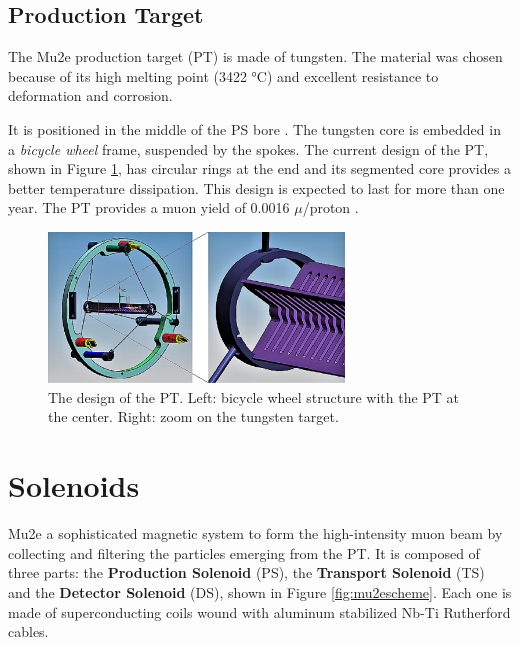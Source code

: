 \subsection{Production Target}
The Mu2e production target (PT) is made of tungsten. 
The material was chosen because of its high 
melting point (3422 °C) and excellent resistance to deformation and corrosion.

It is positioned in the middle of the PS bore \cite{bartoszek2015mu2e}.
The tungsten core is embedded in a \textit{bicycle wheel} frame, 
suspended by the spokes.
The current design of the PT, shown in Figure \ref{fig:PT}, 
has circular rings at the end and its segmented core provides a better temperature 
dissipation. This design is expected to last for more than one year. The PT provides a muon yield of 0.0016 $\mu$/proton \cite{PT}.
\begin{figure}[!h]
    \centering
    \includegraphics[width =0.7\textwidth]{figures/png/Screenshot_20240706_114229.png}
    \caption[The Production Target design.]{The design of the PT. Left: bicycle wheel 
      structure with the PT at the
    center. Right: zoom on the tungsten target.}
    \label{fig:PT}
\end{figure}

\section{Solenoids}
 Mu2e  a sophisticated magnetic system
to form the high-intensity muon beam by collecting and filtering the particles emerging from the PT. 
It is composed of three parts: the \textbf{Production Solenoid} (PS), 
the \textbf{Transport Solenoid} (TS) 
and the \textbf{Detector Solenoid} (DS), shown in Figure \ref{fig:mu2escheme}. 
Each one is made of superconducting 
coils wound with aluminum stabilized Nb-Ti Rutherford cables.

